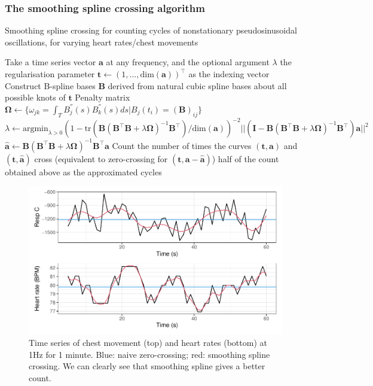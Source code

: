 \documentclass[
]{article}
\begin{document}
\hypertarget{the-smoothing-spline-crossing-algorithm}{%
\subsubsection{The smoothing spline crossing
algorithm}\label{the-smoothing-spline-crossing-algorithm}}

\begin{algorithm}
\caption{Smoothing spline crossing for counting cycles of nonstationary pseudosinusoidal oscillations, for varying heart rates/chest movements}
\begin{algorithmic}[1]
\STATE Take a time series vector $\mathbf{a}$ at any frequency, and the optional argument $\lambda$ the regularisation parameter
\STATE $\mathbf{t} \leftarrow (1, ..., \text{dim}(\mathbf{a}))^\top$ as the indexing vector
\STATE Construct B-spline bases $\mathbf{B}$ derived from natural cubic spline bases about all possible knots of $\mathbf{t}$
\STATE Penalty matrix $\boldsymbol{\Omega} \leftarrow \{\omega_{jk} = \int_T {B_j^{''}(s)B_k^{''}(s)}ds | B_j(t_i) = (\mathbf{B})_{ij}\}$
\STATE $\lambda \leftarrow \text{argmin}_{\lambda > 0} (1 - \text{tr}(\mathbf{B}(\mathbf{B}^\top\mathbf{B} + \lambda\boldsymbol{\Omega})^{-1}\mathbf{B}^\top) / \text{dim}(\mathbf{a}))^{-2}||(\mathbf{I} - \mathbf{B}(\mathbf{B}^\top\mathbf{B} + \lambda\boldsymbol{\Omega})^{-1}\mathbf{B}^\top)\mathbf{a}||^2$
\ENDIF
\STATE $\mathbf{\hat{a}} \leftarrow \mathbf{B}(\mathbf{B}^\top\mathbf{B} + \lambda\boldsymbol{\Omega})^{-1}\mathbf{B}^\top\mathbf{a}$
\STATE Count the number of times the curves $(\mathbf{t}, \mathbf{a})$ and $(\mathbf{t}, \mathbf{\hat{a}})$ cross (equivalent to zero-crossing for $(\mathbf{t}, \mathbf{a} - \mathbf{\hat{a}})$)
\RETURN half of the count obtained above as the approximated cycles
\end{algorithmic}
\end{algorithm}

\begin{figure}

{\centering \includegraphics{report_files/figure-latex/sszc-1} 

}

\caption{Time series of chest movement (top) and heart rates (bottom) at 1Hz for 1 minute. Blue: naive zero-crossing; red: smoothing spline crossing. We can clearly see that smoothing spline gives a better count.}\label{fig:sszc}
\end{figure}
\end{document}
